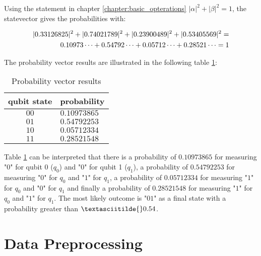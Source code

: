 Using the statement in chapter \ref{chapter:basic_opterations} $|\alpha|^2 + |\beta|^2 = 1$, the statevector gives the probabilities with:

\begin{equation}
    \centering
    \begin{split}
        |0.33126825|^2 + |0.74021789|^2 + |0.23900489|^2 + |0.53405569|^2 = \\
        0.10973\dots +0.54792\dots +0.05712\dots +0.28521\dots = 1 
    \end{split}
    \label{equation:angle_embedding_script_result_statevector}
\end{equation}

The probability vector results are illustrated in the following table \ref{table:angle_embedding_script_result_probabilities}:

\begin{table}[!h]
    \centering
    \begin{tabular}{|c|l|}
        \hline
        qubit state & probability    \\ \hline
        $00$        & $0.10973865$   \\ \hline
        $01$        & $0.54792253$   \\ \hline
        $10$        & $0.05712334$   \\ \hline
        $11$        & $0.28521548$   \\ \hline
        \end{tabular}
    \caption{Probability vector results}
    \label{table:angle_embedding_script_result_probabilities}
\end{table}

Table \ref{table:angle_embedding_script_result_probabilities} can be interpreted that there is a probability of $0.10973865$ for measuring "$0$" for qubit 0 ($q_0$) and "$0$" for qubit 1 ($q_1$), a probability of $0.54792253$ for measuring "$0$" for $q_0$ and "$1$" for $q_1$, a probability of $0.05712334$ for measuring "$1$" for $q_0$ and "$0$" for $q_1$ and finally a probability of $0.28521548$ for measuring "$1$" for $q_0$ and "$1$" for $q_1$. The most likely outcome is "$01$" as a final state with a probability greater than $\textasciitilde{}0.54$.

\section{Data Preprocessing}

